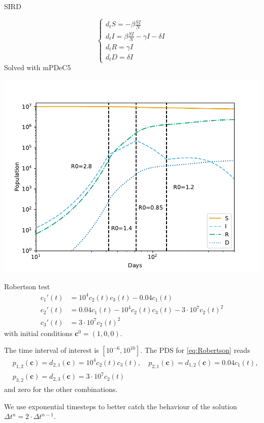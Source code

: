 \documentclass[9pt,compress,t,aspectratio=169]{beamer}
\newcommand{\1}{\begin{pmatrix}
                 1\\
                 1
                \end{pmatrix}}
\def\bc{\mathbf{c}}
\begin{document}
\begin{frame}{SIRD}
	\begin{minipage}{0.35\textwidth}
		\begin{equation*}
		\begin{cases}
		d_tS = - \beta \frac{SI}{N}\\
		d_t I = \beta \frac{SI}{N} -\gamma I- \delta I \\
		d_t R = \gamma I\\
		d_t D = \delta I
		\end{cases}
		\end{equation*}
		Solved with mPDeC5
	\end{minipage} \hfill
	\begin{minipage}{0.63\textwidth}
	\includegraphics[height=0.8\textheight]{images/SIRsimul.pdf}
\end{minipage}
	
\end{frame}


\begin{frame}{Robertson test}
\begin{equation}\label{eq:Robertson}
 \begin{aligned}
  c_1'(t)&=10^4c_2(t)c_3(t)-0.04c_1(t)\\
  c_2'(t)&= 0.04c_1(t)-10^4c_2(t)c_3(t)-3\cdot 10^7c_2(t)^2\\
  c_3'(t)&=3\cdot 10^7c_2(t)^2
 \end{aligned}
\end{equation}
with initial conditions
$\bc^0=(1,0,0)$.

The time interval of interest is $[10^{-6}, 10^{10}]$.
The PDS for \eqref{eq:Robertson} reads
\begin{equation*}
\begin{split}
 & p_{1,2}(\bc)=d_{2,1}(\bc)=10^4c_2(t)c_3(t), \quad  
 p_{2,1}(\bc)=d_{1,2}(\bc)=0.04c_1(t),\\ 
 & p_{3,2}(\bc)=d_{2,3}(\bc)=3\cdot 10^7c_2(t)
\end{split}
\end{equation*}
and zero for the other combinations.

We use exponential timesteps to better catch the behaviour of the solution $\Delta t^n = 2\cdot \Delta t^{n-1}$.
\end{frame}
\end{document}

